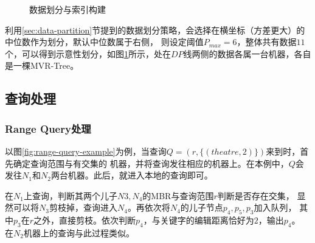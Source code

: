 \documentclass{ML}
\begin{document}
\begin{figure}[H]
  \caption{数据划分与索引构建} \label{fig:data-partition}
\end{figure}
利用\ref{sec:data-partition}节提到的数据划分策略，会选择在横坐标（方差更大）的中位数作为划分，默认中位数属于右侧，
则设定阈值$P_{max} = 6$，整体共有数据$11$个，可以得到示意性划分，如图\ref{fig:data-partition}所示，处在$DP$线两侧的数据各属一台机器，各自是一棵MVR-Tree。

\subsection{查询处理}
\subsubsection{Range Query处理}
以图\ref{fig:range-query-example}为例，当查询$Q = (r, \{(theatre, 2)\})$来到时，首先确定查询范围与有交集的
机器，并将查询发往相应的机器上。在本例中，$Q$会发往$N_1$和$N_2$两台机器。此后，就进入本地的查询即可。

在$N_1$上查询，判断其两个儿子$N3, N_4$的MBR与查询范围$r$判断是否存在交集，
显然可以将$N_3$剪枝掉，查询进入$N_4$。再依次将$N_4$的儿子节点$p_4, p_5, p_3$加入队列，
其中$p_3$在$r$之外，直接剪枝。依次判断$p_4$，与关键字的编辑距离恰好为$2$，输出$p_4$。
在$N_2$机器上的查询与此过程类似。
\end{document}
